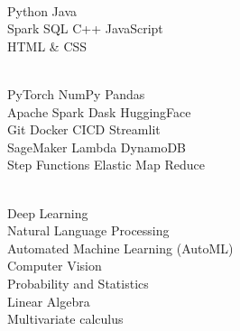 \documentclass[]{deedy-resume-openfont}
\begin{document}
\begin{minipage}[t]{.315\textwidth}
     \\
    Python 
    \enspace \textbullet \enspace 
    Java 
    \subsectionsep
    \\
    Spark SQL
    \enspace \textbullet \enspace 
    C++
    \enspace \textbullet \enspace 
    JavaScript \\  
    HTML \& CSS \\
\end{minipage} \hfill 
\begin{minipage}[t]{.335\textwidth}
    \\
    PyTorch 
    \enspace \textbullet \enspace 
    NumPy
    \enspace \textbullet \enspace 
    Pandas \\
    Apache Spark
    \enspace \textbullet \enspace 
    Dask
    \enspace \textbullet \enspace  
    HuggingFace
    \subsectionsep
    \\
    Git
    \enspace \textbullet \enspace 
    Docker 
    \enspace \textbullet \enspace 
    CICD 
    \enspace \textbullet \enspace 
    Streamlit
    \subsectionsep
    \\
    SageMaker
    \enspace \textbullet \enspace 
    Lambda 
    \enspace \textbullet \enspace 
    DynamoDB \\
    Step Functions
    \enspace \textbullet \enspace 
    Elastic Map Reduce \\  
\end{minipage} \hfill 
\begin{minipage}[t]{.325\textwidth}
    \\
    Deep Learning \\
    Natural Language Processing \\
    Automated Machine Learning (AutoML) \\
    Computer Vision
    \subsectionsep
    \\
    Probability and Statistics \\
    Linear Algebra \\
    Multivariate calculus \\
\end{minipage}
\end{document}
